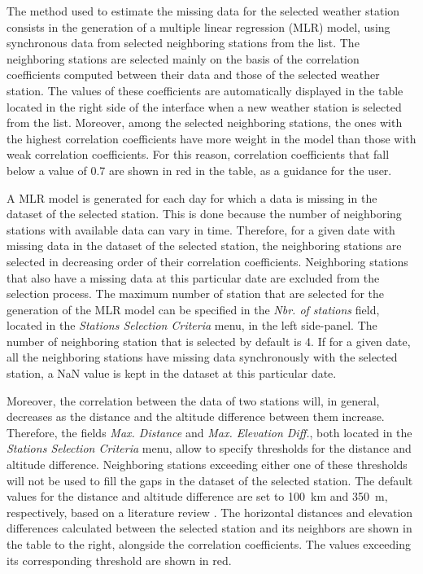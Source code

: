 \documentclass[WHATMANUAL.tex]{subfiles}
\begin{document}
The method used to estimate the missing data for the selected weather station consists in the generation of a multiple linear regression (MLR) model, using synchronous data from selected neighboring stations from the list. The neighboring stations are selected mainly on the basis of the correlation coefficients computed between their data and those of the selected weather station. The values of these coefficients are automatically displayed in the table located in the right side of the interface when a new weather station is selected from the list. Moreover, among the selected neighboring stations, the ones with the highest correlation coefficients have more weight in the model than those with weak correlation coefficients. For this reason, correlation coefficients that fall below a value of 0.7 are shown in red in the table, as a guidance for the user.

A MLR model is generated for each day for which a data is missing in the dataset of the selected station. This is done because the number of neighboring stations with available data can vary in time. Therefore, for a given date with missing data in the dataset of the selected station, the neighboring stations are selected in decreasing order of their correlation coefficients. Neighboring stations that also have a missing data at this particular date are excluded from the selection process. The maximum number of station that are selected for the generation of the MLR model can be specified in the \emph{Nbr. of stations} field, located in the \emph{Stations Selection Criteria} menu, in the left side-panel. The number of neighboring station that is selected by default is 4. If for a given date, all the neighboring stations have missing data synchronously with the selected station, a NaN value is kept in the dataset at this particular date. 

Moreover, the correlation between the data of two stations will, in general, decreases as the distance and the altitude difference between them increase. Therefore, the fields \emph{Max. Distance} and \emph{Max. Elevation Diff.}, both located in the \emph{Stations Selection Criteria} menu, allow to specify thresholds for the distance and altitude difference. Neighboring stations exceeding either one of these thresholds will not be used to fill the gaps in the dataset of the selected station. The default values for the distance and altitude difference are set to \SI{100}{km} and \SI{350}{m}, respectively, based on a literature review \citep{tronci_comparison_1986,xia_forest_1999,simolo_improving_2010}. The horizontal distances and elevation differences calculated between the selected station and its neighbors are shown in the table to the right, alongside the correlation coefficients. The values exceeding its corresponding threshold are shown in red.
\end{document}
